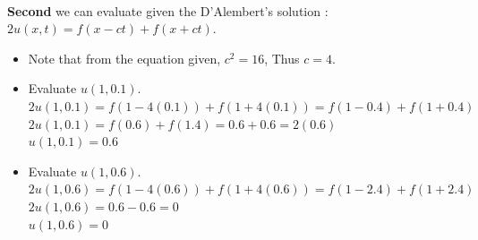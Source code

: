 \documentclass[10pt]{article}
\begin{document}
\begin{center}
 \\
\end{center}

\noindent
\textbf{Second} we can evaluate given the D'Alembert's solution : $ 2u(x,t) = f(x-ct) + f(x+ct). $ \\

\begin{itemize}
    \item Note that from the equation given, $ \displaystyle c^2 = 16 $, Thus $ \displaystyle c = 4 $. \\
    \item Evaluate $ \displaystyle u(1,0.1) $. \\
    \subitem $ \displaystyle 2u(1,0.1) = f(1-4(0.1)) + f(1+4(0.1)) = f(1-0.4) + f(1+0.4) $ \\
    \subitem $ \displaystyle 2u(1,0.1) = f(0.6) + f(1.4) = 0.6 + 0.6 = 2(0.6) $ \\
    \subitem $ \displaystyle u(1,0.1) = 0.6 $ \\
    \item Evaluate $ \displaystyle u(1,0.6) $. \\
    \subitem $ \displaystyle 2u(1,0.6) = f(1-4(0.6)) + f(1+4(0.6)) = f(1-2.4) + f(1+2.4) $ \\
    \subitem $ \displaystyle 2u(1,0.6) = 0.6 - 0.6 = 0 $ \\
    \subitem $ \displaystyle u(1,0.6) = 0 $ \\
\end{itemize}
\end{document}

